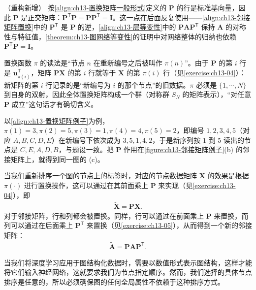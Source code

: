 \documentclass[../../main.tex]{subfiles}
\begin{document}
\begin{remark}（重构新增）
按\eqref{align:ch13-置换矩阵一般形式}定义的 $\bm{P}$ 的行是标准基向量，因此 $\bm{P}$ 是正交矩阵：$\bm{P}^{\mathsf T}\bm{P}=\bm{P}\bm{P}^{\mathsf T}=\bm{I}$。这一点在后面反复使用——\eqref{align:ch13-邻接矩阵置换}中的 $\bm{P}^{\mathsf T}$ 是 $\bm{P}$ 的逆，\eqref{align:ch13-层等变性}中的 $\bm{P}\bm{A}\bm{P}^{\mathsf T}$ 保持 $\bm{A}$ 的对称性与特征值，\cref{theorem:ch13-图网络等变性}的证明中对网络整体的归纳也依赖 $\bm{P}^{\mathsf T}\bm{P}=\bm{I}$。\par
置换函数 $\pi$ 的读法是“节点 $n$ 在重新编号之后被叫作 $\pi(n)$”。由于 $\bm{P}$ 的第 $i$ 行是 $\bm{u}_{\pi(i)}^{\mathsf T}$，矩阵 $\bm{P}\bm{X}$ 的第 $i$ 行就等于 $\bm{X}$ 的第 $\pi(i)$ 行（见\cref{exercise:ch13-04}）：新矩阵的第 $i$ 行记录的是“新编号为 $i$ 的那个节点”的旧数据。$\pi$ 必须是 $\{1,\cdots,N\}$ 到自身的双射，因此全体置换矩阵构成一个群（对称群 $S_N$ 的矩阵表示），“对任意 $\bm{P}$ 成立”这句话才有确切含义。\par
以\eqref{align:ch13-置换矩阵例子}为例，$\pi(1)=3,\pi(2)=5,\pi(3)=1,\pi(4)=4,\pi(5)=2$，即编号 $1,2,3,4,5$（对应 $A,B,C,D,E$）在新编号下依次成为 $3,5,1,4,2$，于是新序列按 $1$ 到 $5$ 读出的节点是 $C,E,A,D,B$，与题设一致。把 $\bm{P}$ 作用在\cref{figure:ch13-邻接矩阵例子}(b) 的邻接矩阵上，就得到同一图的 (c)。
\end{remark}

当我们重新排序一个图的节点上的标签时，对应的节点数据矩阵 $\bm{X}$ 的效果是根据 $\pi(\cdot)$ 进行置换操作，这可以通过在其前面乘上 $\bm{P}$ 来实现（见\cref{exercise:ch13-04}），即
\begin{align}
\widetilde{\bm{X}}=\bm{P}\bm{X}.
\label{align:ch13-数据矩阵置换}
\end{align}
对于邻接矩阵，行和列都会被置换。同样，行可以通过在前面乘上 $\bm{P}$ 来置换，而列可以通过在后面乘上 $\bm{P}^{\mathsf T}$ 来置换（见\cref{exercise:ch13-05}），从而得到一个新的邻接矩阵：
\begin{align}
\widetilde{\bm{A}}=\bm{P}\bm{A}\bm{P}^{\mathsf T}.
\label{align:ch13-邻接矩阵置换}
\end{align}

当我们将深度学习应用于图结构化数据时，需要以数值形式表示图结构，这样才能将它们输入神经网络，这就要求我们为节点指定顺序。然而，我们选择的具体节点排序是任意的，所以必须确保图的任何全局属性不依赖于这种排序方式。
\end{document}

